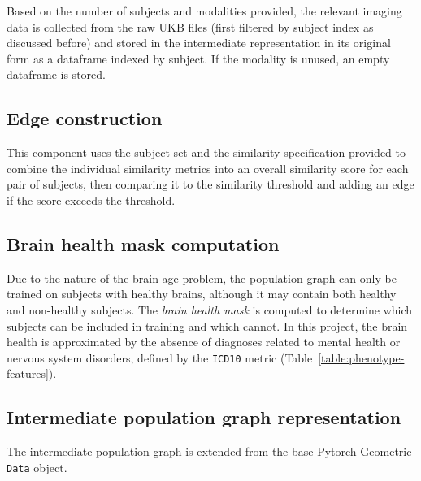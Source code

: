 Based on the number of subjects and modalities provided, the relevant imaging data is collected from the raw UKB files (first filtered by subject index as discussed before) and stored in the intermediate representation in its original form as a dataframe indexed by subject. If the modality is unused, an empty dataframe is stored.


\subsection{Edge construction}

This component uses the subject set and the similarity specification provided to combine the individual similarity metrics into an overall similarity score for each pair of subjects, then comparing it to the similarity threshold and adding an edge if the score exceeds the threshold.

\subsection{Brain health mask computation}

Due to the nature of the brain age problem, the population graph can only be trained on subjects with healthy brains, although it may contain both healthy and non-healthy subjects. The \textit{brain health mask} is computed to determine which subjects can be included in training and which cannot. In this project, the brain health is approximated by the absence of diagnoses related to mental health or nervous system disorders, defined by the \texttt{ICD10} metric (Table~\ref{table:phenotype-features}).

\subsection{Intermediate population graph representation}
The intermediate population graph is extended from the base Pytorch Geometric \texttt{Data} object. 


